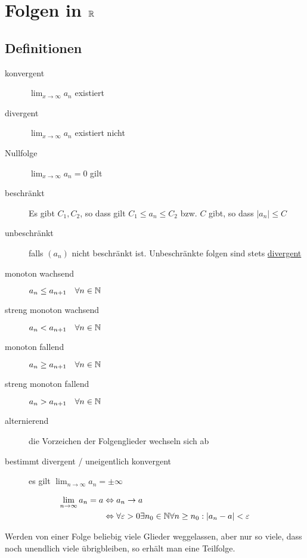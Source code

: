 \section{Folgen in $\mathbb{R}$}

\subsection{Definitionen}
\begin{description}
  \item[konvergent] $\lim_{x \to \infty} a_n$ existiert
  \item[divergent] $\lim_{x \to \infty} a_n$ existiert nicht
  \item[Nullfolge] $\lim_{x \to \infty} a_n = 0$ gilt
  \item[beschränkt] Es gibt $C_1, C_2$, so dass gilt $C_1 \leq a_n \leq C_2$
  bzw. $C$ gibt, so dass $|a_n| \leq C$
  \item[unbeschränkt] falls $(a_n)$ nicht beschränkt ist. Unbeschränkte folgen
  sind stets \underline{divergent}
  \item[monoton wachsend] $a_n \leq a_{n+1} \quad \forall n \in \mathbb{N}$
  \item[streng monoton wachsend] $a_n < a_{n+1} \quad \forall n \in \mathbb{N}$
  \item[monoton fallend] $a_n \geq a_{n+1} \quad \forall n \in \mathbb{N}$
  \item[streng monoton fallend] $a_n > a_{n+1} \quad \forall n \in \mathbb{N}$
  \item[alternierend] die Vorzeichen der Folgenglieder wechseln sich ab
  \item[bestimmt divergent / uneigentlich konvergent] es gilt $\lim_{n \to
  \infty} a_n = \pm \infty$
\end{description}

\begin{definition}[Grenzwert]
	\begin{align*}
		\lim_{n \to \infty} a_n = a & \Leftrightarrow a_n \to a \\
		& \Leftrightarrow \forall \varepsilon > 0 \exists n_0 \in \mathbb{N} \forall n \geq n_0:
		|a_n - a| < \varepsilon
	\end{align*}
\end{definition}

\begin{definition}[Teilfolge]
Werden von einer Folge beliebig viele Glieder weggelassen, aber nur so viele,
dass noch unendlich viele übrigbleiben, so erhält man eine Teilfolge.
\end{definition}

